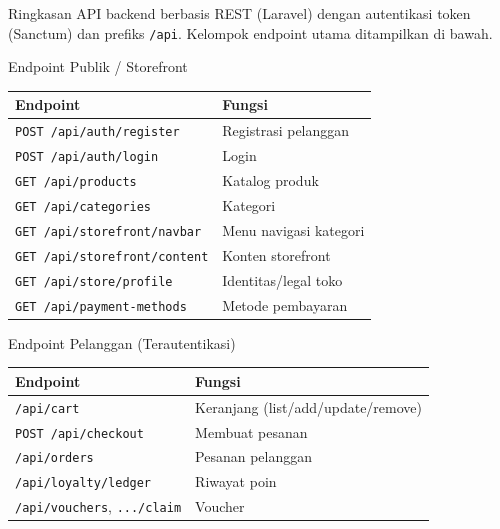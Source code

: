 
\begin{flowsection}{Ringkasan}
API backend berbasis REST (Laravel) dengan autentikasi token (Sanctum) dan
prefiks \texttt{/api}. Kelompok endpoint utama ditampilkan di bawah.
\end{flowsection}

\begin{flowsection}{Endpoint Publik / Storefront}
\begin{center}
\renewcommand{\arraystretch}{1.25}
\begin{tabular}{|l|p{8.5cm}|}
\hline
\textbf{Endpoint} & \textbf{Fungsi} \\ \hline
\texttt{POST /api/auth/register} & Registrasi pelanggan \\ \hline
\texttt{POST /api/auth/login} & Login \\ \hline
\texttt{GET  /api/products} & Katalog produk \\ \hline
\texttt{GET  /api/categories} & Kategori \\ \hline
\texttt{GET  /api/storefront/navbar} & Menu navigasi kategori \\ \hline
\texttt{GET  /api/storefront/content} & Konten storefront \\ \hline
\texttt{GET  /api/store/profile} & Identitas/legal toko \\ \hline
\texttt{GET  /api/payment-methods} & Metode pembayaran \\ \hline
\end{tabular}
\end{center}
\end{flowsection}

\begin{flowsection}{Endpoint Pelanggan (Terautentikasi)}
\begin{center}
\renewcommand{\arraystretch}{1.25}
\begin{tabular}{|l|p{8.5cm}|}
\hline
\textbf{Endpoint} & \textbf{Fungsi} \\ \hline
\texttt{/api/cart} & Keranjang (list/add/update/remove) \\ \hline
\texttt{POST /api/checkout} & Membuat pesanan \\ \hline
\texttt{/api/orders} & Pesanan pelanggan \\ \hline
\texttt{/api/loyalty/ledger} & Riwayat poin \\ \hline
\texttt{/api/vouchers}, \texttt{.../claim} & Voucher \\ \hline
\end{tabular}
\end{center}
\end{flowsection}

